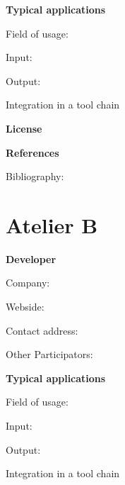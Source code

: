 \documentclass{./template/openetcs2}
\begin{document}
	\textbf{Typical applications}

	Field of usage:


	Input:

	Output:





	Integration in a tool chain



	\textbf{License}


	\textbf{References}

	Bibliography:


\section{Atelier B}

	\textbf{Developer}

	Company: 

	Webside:

	Contact address:

	Other  Participators:



	\textbf{Typical applications}

	Field of usage:


	Input:

	Output:





	Integration in a tool chain
\end{document}
